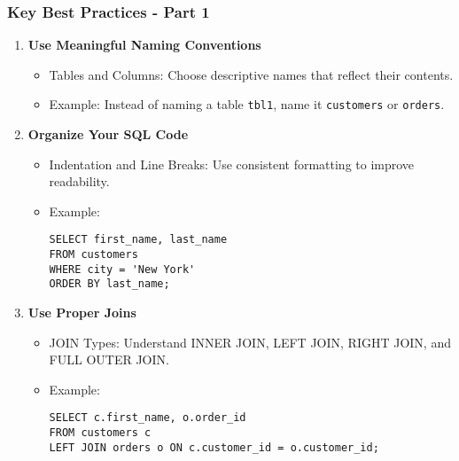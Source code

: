 \documentclass[aspectratio=169]{beamer}
\begin{document}
\begin{frame}[fragile]
    \frametitle{Key Best Practices - Part 1}
    \begin{enumerate}
        \item \textbf{Use Meaningful Naming Conventions}
        \begin{itemize}
            \item Tables and Columns: Choose descriptive names that reflect their contents.
            \item Example: Instead of naming a table \texttt{tbl1}, name it \texttt{customers} or \texttt{orders}.
        \end{itemize}
        
        \item \textbf{Organize Your SQL Code}
        \begin{itemize}
            \item Indentation and Line Breaks: Use consistent formatting to improve readability.
            \item Example:
            \begin{lstlisting}
SELECT first_name, last_name
FROM customers
WHERE city = 'New York'
ORDER BY last_name;
            \end{lstlisting}
        \end{itemize}
        
        \item \textbf{Use Proper Joins}
        \begin{itemize}
            \item JOIN Types: Understand INNER JOIN, LEFT JOIN, RIGHT JOIN, and FULL OUTER JOIN.
            \item Example:
            \begin{lstlisting}
SELECT c.first_name, o.order_id
FROM customers c
LEFT JOIN orders o ON c.customer_id = o.customer_id;
            \end{lstlisting}
        \end{itemize}
    \end{enumerate}
\end{frame}
\end{document}
